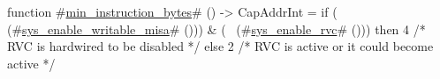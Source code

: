 function #\hyperref[sailRISCVzminzyinstructionzybytes]{min\_instruction\_bytes}# () -> CapAddrInt = {
  if   (~ (#\hyperref[sailRISCVzsyszyenablezywritablezymisa]{sys\_enable\_writable\_misa}# ())) & (~ (#\hyperref[sailRISCVzsyszyenablezyrvc]{sys\_enable\_rvc}# ()))
  then 4  /* RVC is hardwired to be disabled */
  else 2  /* RVC is active or it could become active */
}
